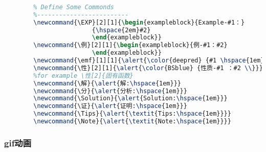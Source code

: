 \begin{frame}[fragile]
    \frametitle{}
    \begin{lstlisting}[language=tex]
        %%------------------------
        % Define Some Commonds
        %-------------------------
        \newcommand{\EXP}[2][1]{\begin{exampleblock}{Example-#1：}
                        {\hspace{2em}#2}
                        \end{exampleblock}}
        \newcommand{\例}[2][1]{\begin{exampleblock}{例-#1：#2}
                        \end{exampleblock}}
        \newcommand{\emf}[1][1]{\alert{\color{deepred} {#1 \hspace{1em}}}}
        \newcommand{\性}[2][1]{\alert{\color{BSblue} {性质-#1 ：#2 \\}}}
        %for example \性[2]{固有函数}
        \newcommand{\解}{\alert{解:\hspace{1em}}}
        \newcommand{\分}{\alert{分析:\hspace{1em}}}
        \newcommand{\Solution}{\alert{Solution:\hspace{1em}}}
        \newcommand{\证}{\alert{证明:\hspace{1em}}}
        \newcommand{\Tips}{\alert{\textit{Tips:\hspace{1em}}}}
        \newcommand{\Note}{\alert{\textit{Note:\hspace{1em}}}}
    \end{lstlisting}
  \end{frame} 



\begin{frame}
  \frametitle{gif动画}
 \begin{center}
  \end{center} 
\end{frame} 


